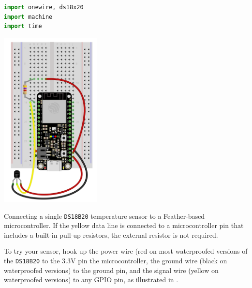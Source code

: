 \begin{lstlisting}[language=Python]
import onewire, ds18x20
import machine
import time
\end{lstlisting}

\begin{marginfigure}[-1cm]
	\begin{center}
		\includegraphics[height=9cm]{Images/singleDS18B20.png}
		\caption[Single DS18B20 on breadboard]{Connecting a single \texttt{DS18B20} temperature sensor to a Feather-based microcontroller.
If the yellow data line is connected to a microcontroller pin that includes a built-in pull-up resistors, the external resistor is not required.}
	\end{center}
\end{marginfigure}
  
To try your sensor, hook up the power wire (red on most waterproofed versions of the \texttt{DS18B20} to the 3.3V pin the microcontroller, the ground wire (black on waterproofed versions) to the ground pin, and the signal wire (yellow on waterproofed versions) to any GPIO pin, as illustrated in . 


